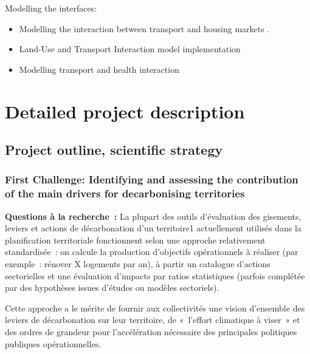 Modelling the interfaces:
\begin{itemize}
    \item Modelling the interaction between transport and housing markets \cite{kilaniModelEvaluationUrban2023}.
    \item Land-Use and Transport Interaction model implementation \cite{liuTransportLandUse2014, feudoHowBuildAlternative2014}
    \item Modelling transport and health interaction \cite{manoutAssessingRoleDaily2021}

\end{itemize}


\section{Detailed project description}

\subsection{Project outline, scientific strategy}

\subsubsection{First Challenge: Identifying and assessing the contribution of the main drivers for decarbonising territories}

\textbf{Questions à la recherche :} La plupart des outils d’évaluation des gisements, leviers et actions de décarbonation d’un territoire1 actuellement utilisés dans la planification territoriale fonctionnent selon une approche relativement standardisée : on calcule la production d’objectifs opérationnels à réaliser (par exemple : rénover X logements par an), à partir un catalogue d’actions sectorielles et une évaluation d’impacts par ratios statistiques (parfois complétée par des hypothèses issues d’études ou modèles sectoriels). 

Cette approche a le mérite de fournir aux collectivités une vision d’ensemble des leviers de décarbonation sur leur territoire, de « l’effort climatique à viser » et des ordres de grandeur pour l’accélération nécessaire des principales politiques publiques opérationnelles. 

